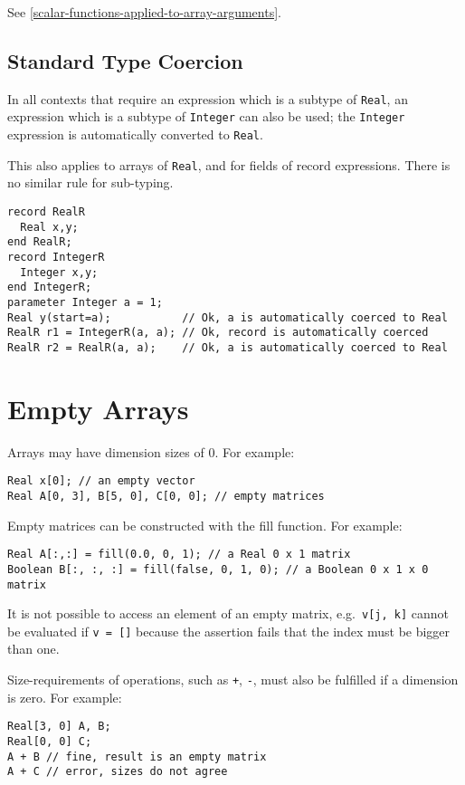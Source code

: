 See \autoref{scalar-functions-applied-to-array-arguments}.

\subsection{Standard Type Coercion}
In all contexts that require an expression which is a subtype of \lstinline!Real!, an expression which is a subtype of \lstinline!Integer! can also be used;
the \lstinline!Integer! expression is automatically converted to \lstinline!Real!.

This also applies to arrays of \lstinline!Real!, and for fields of record expressions.  There is no similar rule for sub-typing.

\begin{example}
\begin{lstlisting}[language=modelica]
record RealR
  Real x,y;
end RealR;
record IntegerR
  Integer x,y;
end IntegerR;
parameter Integer a = 1;
Real y(start=a);           // Ok, a is automatically coerced to Real
RealR r1 = IntegerR(a, a); // Ok, record is automatically coerced
RealR r2 = RealR(a, a);    // Ok, a is automatically coerced to Real
\end{lstlisting}
\end{example}

\section{Empty Arrays}

Arrays may have dimension sizes of 0.  For example:
\begin{lstlisting}[language=modelica]
Real x[0]; // an empty vector
Real A[0, 3], B[5, 0], C[0, 0]; // empty matrices
\end{lstlisting}

Empty matrices can be constructed with the fill function.  For example:
\begin{lstlisting}[language=modelica]
Real A[:,:] = fill(0.0, 0, 1); // a Real 0 x 1 matrix
Boolean B[:, :, :] = fill(false, 0, 1, 0); // a Boolean 0 x 1 x 0 matrix
\end{lstlisting}

It is not possible to access an element of an empty matrix, e.g.\ \lstinline!v[j, k]! cannot be evaluated if \lstinline!v = []! because the assertion fails
that the index must be bigger than one.

Size-requirements of operations, such as \lstinline!+!, \lstinline!-!, must also be fulfilled if a dimension is zero.  For example:
\begin{lstlisting}[language=modelica]
Real[3, 0] A, B;
Real[0, 0] C;
A + B // fine, result is an empty matrix
A + C // error, sizes do not agree
\end{lstlisting}

